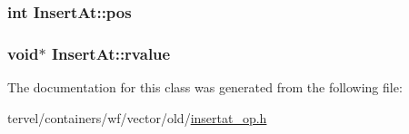 \subsubsection[{pos}]{\setlength{\rightskip}{0pt plus 5cm}int Insert\+At\+::pos}\label{class_insert_at_a926928e16ec2ab511860662a01f3082a}
\hypertarget{class_insert_at_a4cd84946e247761597bde3791508d820}{}
\subsubsection[{rvalue}]{\setlength{\rightskip}{0pt plus 5cm}void$\ast$ Insert\+At\+::rvalue}\label{class_insert_at_a4cd84946e247761597bde3791508d820}


The documentation for this class was generated from the following file\+:\begin{DoxyCompactItemize}
\item 
tervel/containers/wf/vector/old/\hyperlink{insertat__op_8h}{insertat\+\_\+op.\+h}\end{DoxyCompactItemize}
